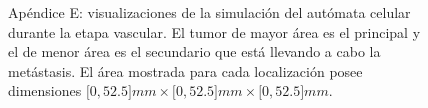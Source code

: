 \begin{appendixes}
\begin{figure}[!ht]
\begin{center}
    
    \end{center}\vspace*{-0.6cm}
    \caption[Ap\'endice E: visualizaciones de la simulaci\'on del aut\'omata celular durante la etapa vascular]{Ap\'endice E: visualizaciones de la simulaci\'on del aut\'omata celular durante la etapa vascular. El tumor de mayor \'area es el principal y el de menor \'area es el secundario que est\'a llevando a cabo la met\'astasis. El \'area mostrada para cada localizaci\'on posee dimensiones $[0,52$.$5]mm \times [0,52$.$5]mm \times [0,52$.$5]mm$.}
    \end{figure}
\end{appendixes}